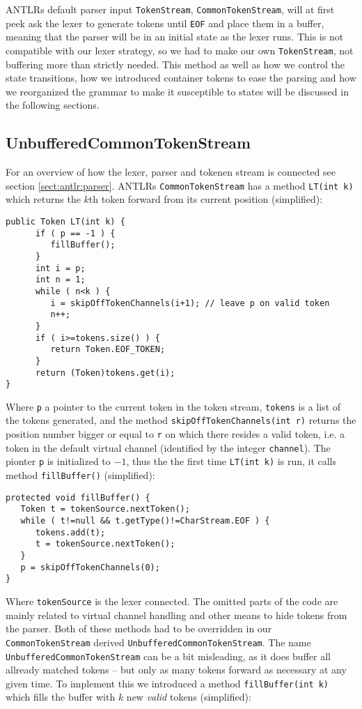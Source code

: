 ANTLRs default parser input \verb!TokenStream!, \verb!CommonTokenStream!, will at first peek ask the lexer to generate tokens until \verb!EOF! and place them in a buffer, meaning that the parser will be in an initial state as the lexer runs. This is not compatible with our lexer strategy, so we had to make our own \verb!TokenStream!, not buffering more than strictly needed. This method as well as how we control the state transitions, how we introduced container tokens to ease the parsing and how we reorganized the grammar to make it susceptible to states will be discussed in the following sections.

\subsection{UnbufferedCommonTokenStream}
For an overview of how the lexer, parser and tokenen stream is connected see section \ref{sect:antlr:parser}. ANTLRs \verb!CommonTokenStream! has a method \verb!LT(int k)! which returns the $k$th token forward from its current position (simplified):
\begin{verbatim}
public Token LT(int k) {
      if ( p == -1 ) {
         fillBuffer();
      }
      int i = p;
      int n = 1;
      while ( n<k ) {
         i = skipOffTokenChannels(i+1); // leave p on valid token
         n++;
      }
      if ( i>=tokens.size() ) {
         return Token.EOF_TOKEN;
      }
      return (Token)tokens.get(i);
}
\end{verbatim}
Where \verb!p! a pointer to the current token in the token stream, \verb!tokens! is a list of the tokens generated, and the method \verb!skipOffTokenChannels(int r)! returns the position number bigger or equal to \verb!r! on which there resides a valid token, i.e. a token in the default virtual channel (identified by the integer \verb!channel!). The pionter \verb!p! is initialized to $-1$, thus the the first time \verb!LT(int k)! is run, it calls method \verb!fillBuffer()! (simplified):
\begin{verbatim}
protected void fillBuffer() {
   Token t = tokenSource.nextToken();
   while ( t!=null && t.getType()!=CharStream.EOF ) {
      tokens.add(t);
      t = tokenSource.nextToken();
   }
   p = skipOffTokenChannels(0);
}
\end{verbatim}
Where \verb!tokenSource! is the lexer connected. The omitted parts of the code are mainly related to virtual channel handling and other means to hide tokens from the parser. Both of these methods had to be overridden in our \verb!CommonTokenStream! derived \verb!UnbufferedCommonTokenStream!. The name \verb!UnbufferedCommonTokenStream! can be a bit misleading, as it does buffer all allready matched tokens -- but only as many tokens forward as necessary at any given time. To implement this we introduced a method \verb!fillBuffer(int k)! which fills the buffer with $k$ new \emph{valid} tokens (simplified):
